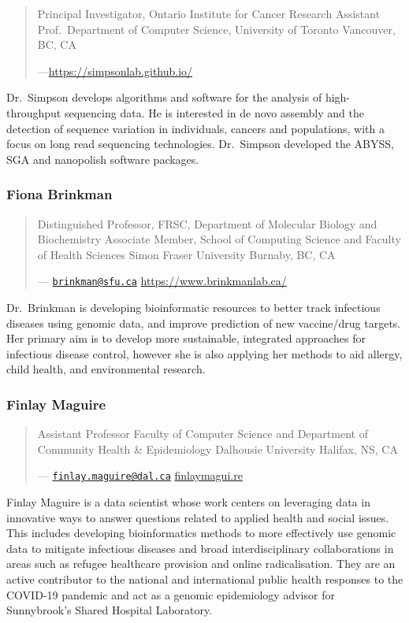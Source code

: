 \documentclass[
]{book}
\begin{document}
\begin{quote}
Principal Investigator, Ontario Institute for Cancer Research
Assistant Prof.~Department of Computer Science, University of Toronto
Vancouver, BC, CA

---\url{https://simpsonlab.github.io/}
\end{quote}

Dr.~Simpson develops algorithms and software for the analysis of
high-throughput sequencing data. He is interested in de novo assembly and the detection of
sequence variation in individuals, cancers and populations, with a focus on long read
sequencing technologies. Dr.~Simpson developed the ABYSS, SGA and nanopolish software
packages.

\subsubsection{Fiona Brinkman}\label{fiona-brinkman}

\begin{quote}
Distinguished Professor, FRSC, Department of Molecular Biology and Biochemistry
Associate Member, School of Computing Science and Faculty of Health Sciences
Simon Fraser University
Burnaby, BC, CA

--- \href{mailto:brinkman@sfu.ca}{\nolinkurl{brinkman@sfu.ca}}
\url{https://www.brinkmanlab.ca/}
\end{quote}

Dr.~Brinkman is developing bioinformatic resources to better track infectious diseases using
genomic data, and improve prediction of new vaccine/drug targets. Her primary aim is to
develop more sustainable, integrated approaches for infectious disease control, however she is
also applying her methods to aid allergy, child health, and environmental research.

\subsubsection{Finlay Maguire}\label{finlay-maguire}

\begin{quote}
Assistant Professor
Faculty of Computer Science and Department of Community Health \& Epidemiology
Dalhousie University
Halifax, NS, CA

--- \href{mailto:finlay.maguire@dal.ca}{\nolinkurl{finlay.maguire@dal.ca}}
\url{finlaymagui.re}
\end{quote}

Finlay Maguire is a data scientist whose work centers on leveraging data in innovative ways to
answer questions related to applied health and social issues. This includes developing
bioinformatics methods to more effectively use genomic data to mitigate infectious diseases and
broad interdisciplinary collaborations in areas such as refugee healthcare provision and online
radicalisation. They are an active contributor to the national and international public health
responses to the COVID-19 pandemic and act as a genomic epidemiology advisor for
Sunnybrook's Shared Hospital Laboratory.
\end{document}
